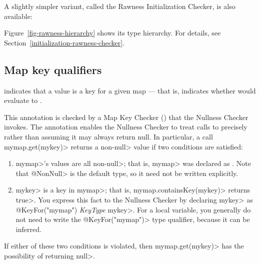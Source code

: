 A slightly simpler variant, called the Rawness Initialization Checker, is also available:

\begin{description}
\item[]
\item[]
\item[]
\end{description}

\noindent
Figure~\ref{fig-rawness-hierarchy} shows its type hierarchy.  For
details, see Section~\ref{initialization-rawness-checker}.


\subsection{Map key qualifiers\label{map-key-qualifiers}}

\begin{description}
\item[]
\end{description}
    indicates that a value is a key for a given map --- that is, indicates
    whether  would evaluate to .

This annotation is checked by a Map Key Checker
() that the Nullness Checker
invokes.  The  annotation enables
the Nullness Checker to treat calls to
precisely rather than assuming it may always return null.  In particular,
a call \<mymap.get(mykey)> returns a non-\<null> value if two conditions
are satisfied:
\begin{enumerate}
\item \<mymap>'s values are all non-\<null>; that is, \<mymap> was
  declared as .  Note
  that \<@NonNull> is the default type, so it need not be written explicitly.
\item \<mykey> is a key in \<mymap>; that is, \<mymap.containsKey(mykey)>
  returns \<true>.  You express this fact to the Nullness Checker by
  declaring \<mykey> as \<@KeyFor("mymap") \emph{KeyType} mykey>.  For a
  local variable, you generally do not need to write the
  \<@KeyFor("mymap")> type qualifier, because it can be inferred.
\end{enumerate}
\noindent
If either of these two conditions is violated, then \<mymap.get(mykey)> has
the possibility of returning \<null>.


